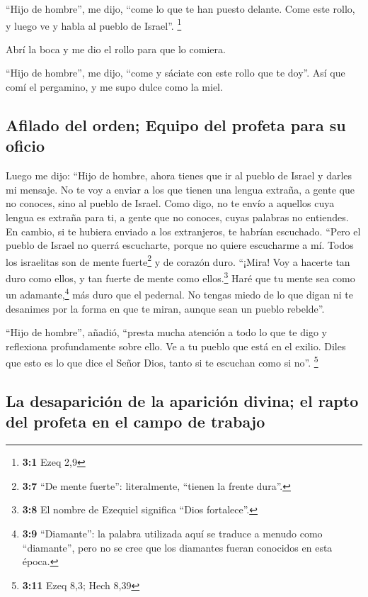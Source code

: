  ``Hijo de hombre'', me dijo, ``come lo que te han puesto
delante. Come este rollo, y luego ve y habla al pueblo de Israel''.
\footnote{\textbf{3:1} Ezeq 2,9}

 Abrí la boca y me dio el rollo para que lo comiera.

 ``Hijo de hombre'', me dijo, ``come y sáciate con este
rollo que te doy''. Así que comí el pergamino, y me supo dulce como la
miel.

\hypertarget{afilado-del-orden-equipo-del-profeta-para-su-oficio}{%
\subsection{Afilado del orden; Equipo del profeta para su
oficio}\label{afilado-del-orden-equipo-del-profeta-para-su-oficio}}

 Luego me dijo: ``Hijo de hombre, ahora tienes que ir al
pueblo de Israel y darles mi mensaje.  No te voy a enviar
a los que tienen una lengua extraña, a gente que no conoces, sino al
pueblo de Israel.  Como digo, no te envío a aquellos cuya
lengua es extraña para ti, a gente que no conoces, cuyas palabras no
entiendes. En cambio, si te hubiera enviado a los extranjeros, te
habrían escuchado.  ``Pero el pueblo de Israel no querrá
escucharte, porque no quiere escucharme a mí. Todos los israelitas son
de mente fuerte\footnote{\textbf{3:7} ``De mente fuerte'': literalmente,
  ``tienen la frente dura''.} y de corazón duro.  ``¡Mira!
Voy a hacerte tan duro como ellos, y tan fuerte de mente como
ellos.\footnote{\textbf{3:8} El nombre de Ezequiel significa ``Dios
  fortalece''.}  Haré que tu mente sea como un
adamante,\footnote{\textbf{3:9} ``Diamante'': la palabra utilizada aquí
  se traduce a menudo como ``diamante'', pero no se cree que los
  diamantes fueran conocidos en esta época.} más duro que el pedernal.
No tengas miedo de lo que digan ni te desanimes por la forma en que te
miran, aunque sean un pueblo rebelde''.

 ``Hijo de hombre'', añadió, ``presta mucha atención a
todo lo que te digo y reflexiona profundamente sobre ello.
 Ve a tu pueblo que está en el exilio. Diles que esto es
lo que dice el Señor Dios, tanto si te escuchan como si no''.
\footnote{\textbf{3:11} Ezeq 8,3; Hech 8,39}

\hypertarget{la-desapariciuxf3n-de-la-apariciuxf3n-divina-el-rapto-del-profeta-en-el-campo-de-trabajo}{%
\subsection{La desaparición de la aparición divina; el rapto del profeta
en el campo de
trabajo}\label{la-desapariciuxf3n-de-la-apariciuxf3n-divina-el-rapto-del-profeta-en-el-campo-de-trabajo}}

